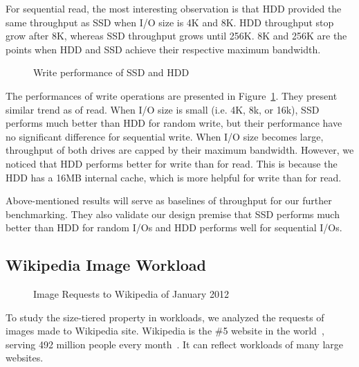 For sequential read, the most interesting observation is that HDD
provided the same throughput as SSD when I/O size is 4K and 8K. HDD
throughput stop grow after 8K, whereas SSD throughput grows until
256K. 8K and 256K are the points when HDD and SSD achieve their
respective maximum bandwidth.

\begin{figure}[t]
\begin{centering}
\caption{Write performance of SSD and HDD}
\label{fig:drivewrite}
\end{centering}
\end{figure}

The performances of write operations are presented in
Figure~\ref{fig:drivewrite}. They present similar trend as of read.
When I/O size is small (i.e. 4K, 8k, or 16k), SSD performs much better
than HDD for random write, but their performance have no significant
difference for sequential write. When I/O size becomes large,
throughput of both drives are capped by their maximum bandwidth.
However, we noticed that HDD performs better for write than for read.
This is because the HDD has a 16MB internal cache, which is more
helpful for write than for read. 

Above-mentioned results will serve as baselines of throughput for our
further benchmarking. They also validate our design premise that SSD
performs much better than HDD for random I/Os and HDD performs well
for sequential I/Os.

\subsection{Wikipedia Image Workload}

\begin{figure}[t]
\begin{centering}
\caption{Image Requests to Wikipedia of January 2012}
\label{fig:wikiimage}
\end{centering}
\end{figure}

To study the size-tiered property in workloads, we analyzed the
requests of images made to Wikipedia site.  Wikipedia is the \#5
website in the world~\cite{wikipedia-web}, serving 492 million people
every month~\cite{wikimedia-foundation}. It can reflect workloads of
many large websites.

